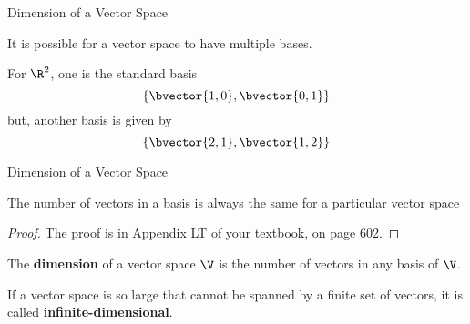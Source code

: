 \documentclass{beamer}
\begin{document}
\begin{frame}{Dimension of a Vector Space}
\begin{example}
It is possible for a vector space to have multiple bases.\pause

For $\R^2$, one is the standard basis
\begin{equation*}
\left\{\bvector{1,0},\bvector{0,1}\right\}
\end{equation*}\pause
but, another basis is given by
\begin{equation*}
\left\{\bvector{2,1},\bvector{1,2}\right\}
\end{equation*}
\end{example}
\end{frame}

\begin{frame}{Dimension of a Vector Space}
\begin{theorem}
The number of vectors in a basis is always the same for a particular vector space
\end{theorem}\pause
\begin{proof}
The proof is in Appendix LT of your textbook, on page 602.
\end{proof}\pause
\begin{definition}
The \textbf{dimension} of a vector space $\V$ is the number of vectors in any basis of $\V$.
\end{definition}\pause

\begin{definition}
If a vector space is so large that cannot be spanned by a finite set of vectors, it is called \textbf{infinite-dimensional}.
\end{definition}
\end{frame}
\end{document}
